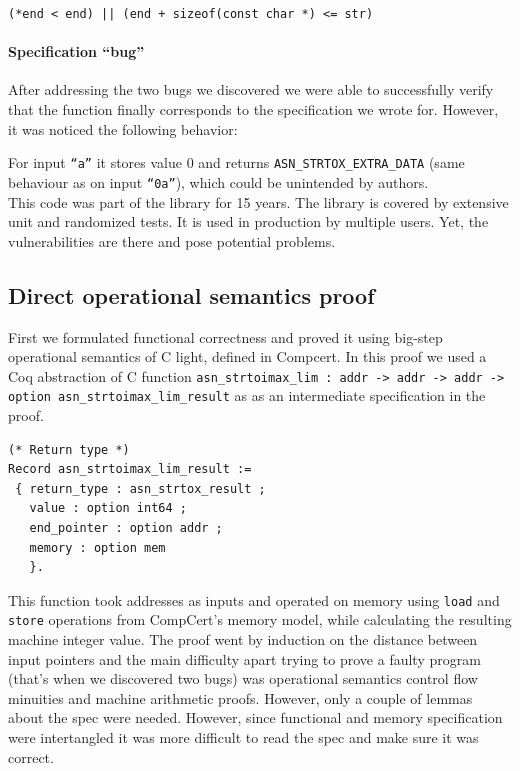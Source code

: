 \documentclass[acmsmall,nonacm]{acmart}
\begin{document}
{\small
\texttt{(*end < end) || (end + sizeof(const char *) <= str)}}


\paragraph{Specification ``bug''}
After addressing the two bugs we discovered we were able to successfully verify that the function finally corresponds to the specification we wrote for. However, it was noticed the following behavior:

For input \texttt{``a''} it stores value 0 and returns {\color{green}\texttt{ASN\_STRTOX\_EXTRA\_DATA}} (same behaviour as on input \texttt{``0a''}), which could be unintended by authors. \\

This code was part of the library for 15 years. The library is covered by extensive unit and randomized tests. It is used in production by multiple users. Yet, the vulnerabilities are there and pose potential problems.

  
\subsection{Direct operational semantics proof}
First we formulated functional correctness and proved it using big-step operational semantics of C light, defined in Compcert. In this proof we used a Coq abstraction of C function \texttt{asn\_strtoimax\_lim : addr -> addr -> addr -> option asn\_strtoimax\_lim\_result} as as an intermediate specification in the proof. 

\begin{lstlisting}[language=Coq]
(* Return type *)
Record asn_strtoimax_lim_result :=
 { return_type : asn_strtox_result ;
   value : option int64 ;
   end_pointer : option addr ;
   memory : option mem 
   }.

\end{lstlisting}

This function took addresses as inputs and operated on memory using \texttt{load} and \texttt{store} operations from CompCert's memory model, while calculating the resulting machine integer value. The proof went by induction on the distance between input pointers and the main difficulty apart trying to prove a faulty program (that's when we discovered two bugs) was operational semantics control flow minuities and machine arithmetic proofs. However, only a couple of lemmas about the spec were needed. However, since functional and memory specification were intertangled it was more difficult to read the spec and make sure it was correct. 
\end{document}

